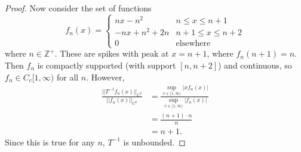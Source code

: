 \documentclass[12pt]{article}
\theoremstyle{definition}
\begin{document}
\begin{proof}
	Now consider the set of functions \begin{equation*}
		f_n(x) = \begin{cases}
			nx - n^2       & n \leq x \leq n + 1    \\
			-nx + n^2 + 2n & n+ 1 \leq x \leq n + 2 \\
			0              & \text{elsewhere}
		\end{cases}
	\end{equation*}
	where $n \in \mathbb{Z}^+$.
	These are spikes with peak at $x = n+1$, where $f_n(n+1) = n$.
	Then $f_n$ is compactly supported (with support $[n, n+ 2]$) and continuous, so $f_n \in C_c[1, \infty)$ for all $n$.
	However, \begin{align*}
		\frac{||T^{-1}f_n(x)||_{C^0}}{||f_n(x)||_{C^0}} & = \frac{\sup_{x \in [1, \infty)} \left|xf_n(x)\right|}{\sup_{x \in [1, \infty)} \left|f_n(x)\right|} \\
		                                                & = \frac{(n+1)\cdot n}{n}                                                                             \\
		                                                & = n+1.
	\end{align*}
	Since this is true for any $n$, $T^{-1}$ is unbounded.
\end{proof}
\end{document}
